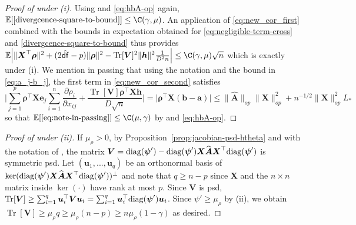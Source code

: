 \documentclass[11pt]{amsart}
\numberwithin{equation}{section}
\numberwithin{equation}{section}
\def\E{{\mathbb{E}}}
\def\diag{\hbox{\rm diag}}
\DeclareMathOperator{\trace}{Tr}
\def\mathbold{\boldsymbol} %
\def\ba{\mathbold{a}}\def\bfa{\mathbold{a}}\def\ahat{\widehat{a}}\def\atil{\widetilde{a}}
\def\bA{\mathbold{A}}\def\calA{{\cal A}}\def\scrA{{\mathscr A}}\def\Ahat{\widehat{A}}\def\Atil{{\widetilde A}}
\def\hbA{{\widehat{\bA}}}\def\tbA{{\widetilde{\bA}}}
\def\bb{\mathbold{b}}\def\bhat{\widehat{b}}\def\btil{\widetilde{b}}
\def\bh{\mathbold{h}}\def\hhat{\widehat{h}}\def\htil{\widetilde{h}}
\def\be{\mathbold{e}}
\def\bu{\mathbold{u}}\def\uhat{\widehat{u}}\def\util{\widetilde{u}}\def\ubar{{\overline u}}
\def\bV{\mathbold{V}}\def\hbV{{\widehat{\bV}}}\def\tbV{{\widetilde{\bV}}}
\def\bX{\mathbold{X}}\def\hbX{{\widehat{\bX}}}\def\tbX{{\widetilde{\bX}}}\def\bXbar{{\overline \bX}}
\def\brho{\mathbold{\rho}}\def\rhohat{\widehat{\rho}}\def\hrho{\widehat{\rho}}
\def\bpsi{\mathbold{\psi}}\def\psihat{\widehat{\psi}}\def\hpsi{\widehat{\psi}}
\def\df{{\hat{\mathsf{df}}}{}}
\begin{document}
{\begin{proof}[Proof of  under (i)]
Using 
and \eqref{eq:hbA-op}
again,
$\E[\eqref{divergcence-square-to-bound}]
\le \C(\gamma,\mu)$. An application of \eqref{eq:new_cor_first}
combined with the bounds in expectation obtained for
\eqref{eq:negligible-term-cross} and \eqref{divergcence-square-to-bound}
thus provides
$
\E\Big|
\|\bX^\top\brho\|^2
+(2\df - p)
\|\brho\|^2
-
\trace[\bV]^2 \|\bh\|^2 \frac{1}{D^2 n}
\Big|
\le 
\C(\gamma,\mu) \sqrt n
$
which is exactly  under (i).
We mention in passing that using the notation and the bound in
\eqref{eq:a_j-b_j},
the first term in \eqref{eq:new_cor_second} satisfies
\begin{equation}
\Big|
\sum_{j=1}^p
\brho^\top\bX\be_j\sum_{i=1}^n
\frac{\partial \rho_i}{\partial x_{ij}}
+ \frac{\trace[\bV]\brho^\top\bX\bh}{D\sqrt n}
\Big|
=\Big|
\brho^\top\bX(\bb-\ba)
\Big|
\le
\|\hbA\|_{op}\|\bX\|_{op}^2 + n^{-1/2}\|\bX\|_{op}^2L_*
\label{eq:note-in-passing}
\end{equation}
so that $\E[\eqref{eq:note-in-passing}]\le \C(\mu,\gamma)$ by  and \eqref{eq:hbA-op}.
\end{proof}
\begin{proof}[Proof of  under (ii)]
    If $\mu_\rho>0$, by Proposition~\ref{prop:jacobian-psd-htheta} and with
    the notation of , the matrix
    $\bV=\diag(\bpsi') - \diag(\bpsi')\bX\hbA\bX^\top\diag(\bpsi')$
    is symmetric psd. Let $(\bu_1,...,\bu_{q})$ be an orthonormal basis
    of $\ker(\diag(\bpsi')\bX\hbA\bX^\top\diag(\bpsi'))^\perp$ 
    and note that $q\ge n-p$ since $\bX$ and the $n\times n$ matrix inside $\ker(\cdot)$
    have rank at most $p$. Since $\bV$ is psd,
    $\trace[\bV]\ge \sum_{i=1}^q \bu_i^\top \bV \bu_i =
    \sum_{i=1}^q \bu_i^\top \diag(\bpsi') \bu_i$. 
    Since $\psi'\ge\mu_\rho$ by (ii), we obtain
    $\trace[\bV]\ge \mu_\rho q \ge \mu_\rho(n-p)\ge n\mu_\rho(1-\gamma)$ as desired.


\end{proof}}
\end{document}
